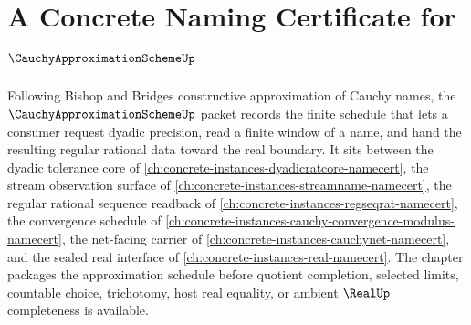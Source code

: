 \chapter{A Concrete Naming Certificate for $\CauchyApproximationSchemeUp$}
\label{ch:concrete-instances-cauchy-approximation-scheme-namecert}

Following Bishop and Bridges constructive approximation of Cauchy names, the $\CauchyApproximationSchemeUp$ packet records the finite schedule that lets a consumer request dyadic precision, read a finite window of a name, and hand the resulting regular rational data toward the real boundary. It sits between the dyadic tolerance core of \autoref{ch:concrete-instances-dyadicratcore-namecert}, the stream observation surface of \autoref{ch:concrete-instances-streamname-namecert}, the regular rational sequence readback of \autoref{ch:concrete-instances-regseqrat-namecert}, the convergence schedule of \autoref{ch:concrete-instances-cauchy-convergence-modulus-namecert}, the net-facing carrier of \autoref{ch:concrete-instances-cauchynet-namecert}, and the sealed real interface of \autoref{ch:concrete-instances-real-namecert}. The chapter packages the approximation schedule before quotient completion, selected limits, countable choice, trichotomy, host real equality, or ambient $\RealUp$ completeness is available.

